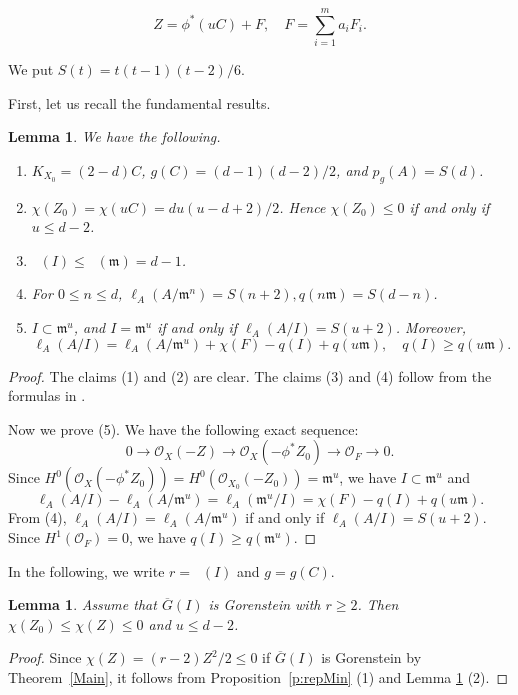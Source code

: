 \documentclass[12pt]{amsart}
\newtheorem{lem}[thm]{Lemma}
\theoremstyle{definition}
\theoremstyle{remark}
\numberwithin{equation}{section}
\newcommand{\thmref}[1]{Theorem~\ref{#1}}
\newcommand{\proref}[1]{Proposition~\ref{#1}}
\DeclareMathOperator{\br}{\bar r}
\newcommand{\m}{\mathfrak m}
\newcommand{\cO}{\mathcal O}
\renewcommand{\:}{\colon}
\newcommand{\ol}[1]{\overline {#1}}
\begin{document}
\[Z = \phi^*(uC) + F, \quad F = \sum_{i=1}^m a_iF_i.\] 

We put $S(t)=t(t-1)(t-2)/6$. 
\par 

First, let us recall the fundamental results. 

\begin{lem}\label{deg d hyp} 
We have the following.
\begin{enumerate}
\item  $K_{X_0}=(2-d)C$, $g(C) =  (d-1)(d-2)/2$, and $p_g(A)=S(d)$.
\item $\chi(Z_0)  = \chi(uC)  = du (u - d +2 )/2$. Hence $\chi(Z_0) \le 0$ if and only if $u\le d - 2$.
\item $\br(I) \le \br(\m) = d-1$. 
\item For $0\le n \le d$, $\ell_A(A/\m^n) = S(n+2), q(n\m) = S(d-n)$.
\item $I \subset \m^u$, and  $I=\m^u$ if and only if $\ell_A(A/I)=S(u+2)$.
Moreover, 
\[
\ell_A(A/I)=\ell_A(A/\m^u)+\chi(F)-q(I)+q(u\m), \quad q(I)\ge q(u\m).
\]
\end{enumerate}
\end{lem}


\begin{proof} 
The claims (1) and (2) are clear.
The claims (3) and (4) follow from the formulas in \cite[\S 4.1]{OWY5}. 
\par
Now we prove (5).
 We have the following exact sequence:
\[
0 \to \cO_X(-Z) \to \cO_X(-\phi^*Z_0) \to \cO_F \to 0.
\]
Since $H^0(\cO_X(-\phi^*Z_0))=H^0(\cO_{X_0}(-Z_0))=\m^u$, 
we have $I \subset \m^u$ and 
\[
\ell_A(A/I)-\ell_A(A/\m^u)= \ell_A(\m^u/I)=\chi(F) - q(I) + q(u \m).
\]
From (4), $\ell_A(A/I)=\ell_A(A/\m^u)$ if and only if $\ell_A(A/I)=S(u+2)$.
Since $H^1(\cO_F)=0$, we have $q(I) \ge q(\m^u)$.
\end{proof}

\par 
In the following, we write $r=\br(I)$ and $g=g(C)$. 


\begin{lem}\label{l:u} 
Assume that $\overline{G}(I)$ is Gorenstein with 
$r \ge 2$. Then  $\chi(Z_0) \le \chi(Z)\le 0$ and $u\le d-2$.
\end{lem}

\begin{proof} Since $\chi(Z)=(r-2)Z^2/2 \le 0$ if $\ol G (I)$ is Gorenstein by \thmref{Main}, it follows from  \proref{p:repMin} (1) and Lemma \ref{deg d hyp} (2).
\end{proof}
\end{document}
